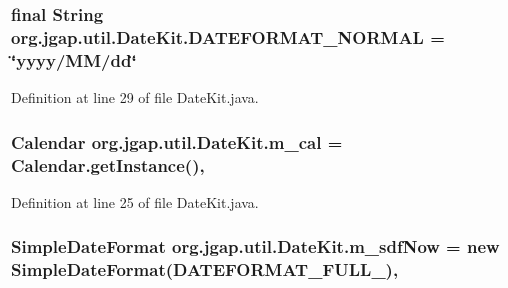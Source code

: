\hypertarget{classorg_1_1jgap_1_1util_1_1_date_kit_af6ae28529731d6ab17dd2899f35a52a6}{
\subsubsection[{D\-A\-T\-E\-F\-O\-R\-M\-A\-T\-\_\-\-N\-O\-R\-M\-A\-L}]{\setlength{\rightskip}{0pt plus 5cm}final String org.\-jgap.\-util.\-Date\-Kit.\-D\-A\-T\-E\-F\-O\-R\-M\-A\-T\-\_\-\-N\-O\-R\-M\-A\-L = \char`\"{}yyyy/M\-M/dd\char`\"{}\hspace{0.3cm}{\ttfamily [static]}}}\label{classorg_1_1jgap_1_1util_1_1_date_kit_af6ae28529731d6ab17dd2899f35a52a6}


Definition at line 29 of file Date\-Kit.\-java.

\hypertarget{classorg_1_1jgap_1_1util_1_1_date_kit_a2bbecbcb52fcdd64f65e3776361163b5}{
\subsubsection[{m\-\_\-cal}]{\setlength{\rightskip}{0pt plus 5cm}Calendar org.\-jgap.\-util.\-Date\-Kit.\-m\-\_\-cal = Calendar.\-get\-Instance()\hspace{0.3cm}{\ttfamily [static]}, {\ttfamily [private]}}}\label{classorg_1_1jgap_1_1util_1_1_date_kit_a2bbecbcb52fcdd64f65e3776361163b5}


Definition at line 25 of file Date\-Kit.\-java.

\hypertarget{classorg_1_1jgap_1_1util_1_1_date_kit_abd728fab6e51025cd5adb0823ecd7186}{
\subsubsection[{m\-\_\-sdf\-Now}]{\setlength{\rightskip}{0pt plus 5cm}Simple\-Date\-Format org.\-jgap.\-util.\-Date\-Kit.\-m\-\_\-sdf\-Now = new Simple\-Date\-Format({\bf D\-A\-T\-E\-F\-O\-R\-M\-A\-T\-\_\-\-F\-U\-L\-L\-\_})\hspace{0.3cm}{\ttfamily [static]}, {\ttfamily [private]}}}\label{classorg_1_1jgap_1_1util_1_1_date_kit_abd728fab6e51025cd5adb0823ecd7186}


